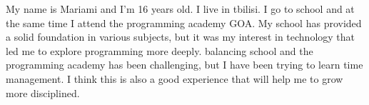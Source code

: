My name is Mariami and I'm 16 years old. I live in tbilisi.
 I go to school and at the same time I attend the programming academy GOA. 
 My school has provided a solid foundation in various subjects, but it was my interest in technology that led me to
 explore programming more deeply. balancing school and the programming academy has been challenging, but I have been trying to learn time management.
 I think this is also a good experience that will help me to grow more disciplined.